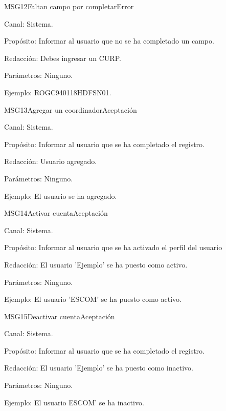 
\begin{mensaje}{MSG12}{Faltan campo por completar}{Error}
	\item[Canal:] Sistema.
	\item[Propósito:] Informar al usuario que no se ha completado un campo.
	\item[Redacción:] Debes ingresar un CURP.
	\item[Parámetros:] Ninguno.
	\item[Ejemplo:] ROGC940118HDFSN01.
\end{mensaje}
\newline



\begin{mensaje}{MSG13}{Agregar un coordinador}{Aceptación}
	\item[Canal:] Sistema.
	\item[Propósito:] Informar al usuario que se ha completado el registro.
	\item[Redacción:] Usuario agregado.
	\item[Parámetros:] Ninguno.
	\item[Ejemplo:] El usuario se ha agregado.
\end{mensaje}
\newline


\begin{mensaje}{MSG14}{Activar cuenta}{Aceptación}
	\item[Canal:] Sistema.
	\item[Propósito:] Informar al usuario que se ha activado el perfil del usuario
	\item[Redacción:] El usuario 'Ejemplo' se ha puesto como activo.
	\item[Parámetros:] Ninguno.
	\item[Ejemplo:] El usuario 'ESCOM' se ha puesto como activo.
\end{mensaje}
\newline


\begin{mensaje}{MSG15}{Deactivar cuenta}{Aceptación}
	\item[Canal:] Sistema.
	\item[Propósito:] Informar al usuario que se ha completado el registro.
	\item[Redacción:] El usuario 'Ejemplo' se ha puesto como inactivo.
	\item[Parámetros:] Ninguno.
	\item[Ejemplo:] El usuario ESCOM' se ha inactivo.
\end{mensaje}
\newline



